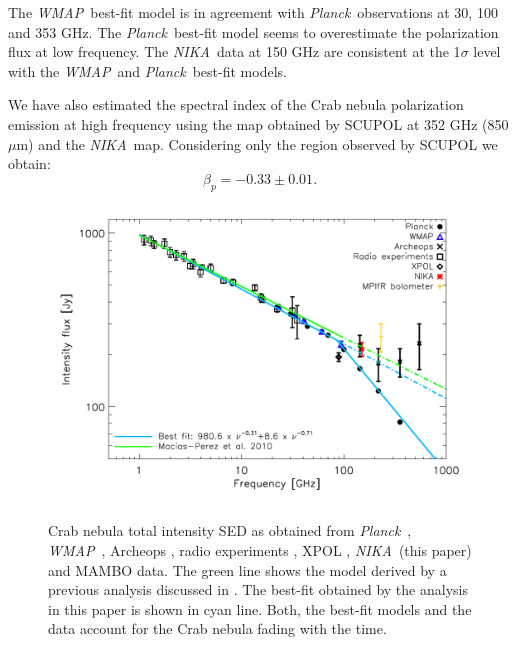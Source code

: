 \documentclass[twocolumn,traditabstract]{aa}
\def\NIKA{\textit{NIKA}}
\def\Planck{\textit{Planck}}
\def\WMAP{\textit{WMAP}}
\begin{document}
The \WMAP\ best-fit model is in agreement with \Planck\ observations at 30, 100 and 353 GHz.
The \Planck\ best-fit model seems to overestimate the polarization flux at low frequency. 
The \NIKA\ data at 150 GHz are consistent at the 1$\sigma$ level with the \WMAP\ and \Planck\ best-fit models.

We have also estimated the spectral index of the Crab nebula polarization emission at high frequency using the map obtained by SCUPOL at 352 GHz (850 $\mu$m) and the \NIKA\ map. Considering only the region observed by SCUPOL we obtain:
\begin{equation}
\beta_p = -0.33 \pm 0.01.
\end{equation}

\begin{figure}
  \centering
          { \includegraphics[width=1\linewidth,keepaspectratio]{figures/Crab_SED_i_150.pdf}}
           \caption{Crab nebula total intensity SED as obtained from \Planck\ \citep{2015arXiv150702058P}, \WMAP\ \citep{2011ApJS..192...19W}, Archeops \citep{macias2007archeops}, radio experiments \citep{dmitrenko1970absolute, 1971IzVUZ..14..157V}, XPOL \citep{aumont2010}, \NIKA\ (this paper) and MAMBO \citep{2002A&A...386.1044B} data. The green line shows the model derived by a previous analysis discussed in \citep{macias2010}. The best-fit obtained by the analysis in this paper is shown in cyan line. Both, the best-fit models and the data account for the Crab nebula fading with the time.}
\label{crab_SED}		
  \end{figure} 
\end{document}
